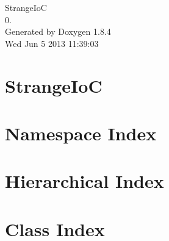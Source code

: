 \documentclass[twoside]{book}
\newcommand{\clearemptydoublepage}{%
  \newpage{\pagestyle{empty}\cleardoublepage}%
}
\begin{document}
\hypersetup{pageanchor=false}
\begin{titlepage}
\vspace*{7cm}
\begin{center}%
{\Large Strange\-Io\-C \\[1ex]\large 0. }\\
\vspace*{1cm}
{\large Generated by Doxygen 1.8.4}\\
\vspace*{0.5cm}
{\small Wed Jun 5 2013 11:39:03}\\
\end{center}
\end{titlepage}
\clearemptydoublepage
\tableofcontents
\clearemptydoublepage
{}
\hypersetup{pageanchor=true}

\chapter{Strange\-Io\-C}
\label{index}\hypertarget{index}{}
\chapter{Namespace Index}

\chapter{Hierarchical Index}

\chapter{Class Index}

\end{document}
